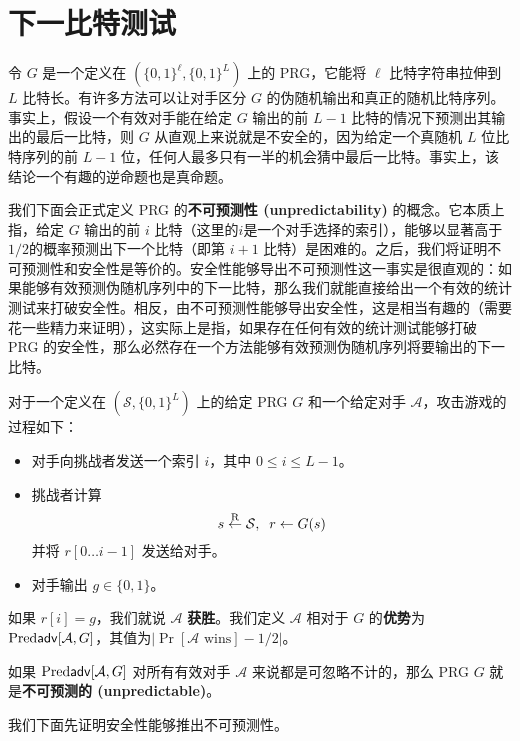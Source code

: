 \section{下一比特测试}

令 $G$ 是一个定义在 $(\{0,1\}^\ell,\{0,1\}^L)$ 上的 PRG，它能将 $\ell$ 比特字符串拉伸到 $L$ 比特长。有许多方法可以让对手区分 $G$ 的伪随机输出和真正的随机比特序列。事实上，假设一个有效对手能在给定 $G$ 输出的前 $L-1$ 比特的情况下预测出其输出的最后一比特，则 $G$ 从直观上来说就是不安全的，因为给定一个真随机 $L$ 位比特序列的前 $L-1$ 位，任何人最多只有一半的机会猜中最后一比特。事实上，该结论一个有趣的逆命题也是真命题。

我们下面会正式定义 PRG 的\textbf{不可预测性 (unpredictability)} 的概念。它本质上指，给定 $G$ 输出的前 $i$ 比特（这里的$i$是一个对手选择的索引），能够以显著高于$1/2$的概率预测出下一个比特（即第 $i+1$ 比特）是困难的。之后，我们将证明不可预测性和安全性是等价的。安全性能够导出不可预测性这一事实是很直观的：如果能够有效预测伪随机序列中的下一比特，那么我们就能直接给出一个有效的统计测试来打破安全性。相反，由不可预测性能够导出安全性，这是相当有趣的（需要花一些精力来证明），这实际上是指，如果存在任何有效的统计测试能够打破 PRG 的安全性，那么必然存在一个方法能够有效预测伪随机序列将要输出的下一比特。

\begin{game}\label{game:3-2}
对于一个定义在 $(\mathcal{S},\{0,1\}^L)$ 上的给定 PRG $G$ 和一个给定对手 $\mathcal{A}$，攻击游戏的过程如下：
\begin{itemize}
	\item 对手向挑战者发送一个索引 $i$，其中 $0\leq i\leq L-1$。
	\item 挑战者计算
	$$s\overset{\rm R}\leftarrow\mathcal{S},\;\; r\leftarrow G(s)$$
	并将 $r[0\dots i-1]$ 发送给对手。
	\item 对手输出 $g\in\{0,1\}$。
\end{itemize}
如果 $r[i]=g$，我们就说 $\mathcal{A}$ \textbf{获胜}。我们定义 $\mathcal{A}$ 相对于 $G$ 的\textbf{优势}为 ${\rm Pred\mathsf{adv}}[\mathcal{A},G]$，其值为$|\Pr[\mathcal{A}\text{ wins}]-{1}/{2}|$。
\end{game}

\begin{definition}
如果 ${\rm Pred\mathsf{adv}}[\mathcal{A},G]$ 对所有有效对手 $\mathcal{A}$ 来说都是可忽略不计的，那么 PRG $G$ 就是\textbf{不可预测的 (unpredictable)}。
\end{definition}

我们下面先证明安全性能够推出不可预测性。

